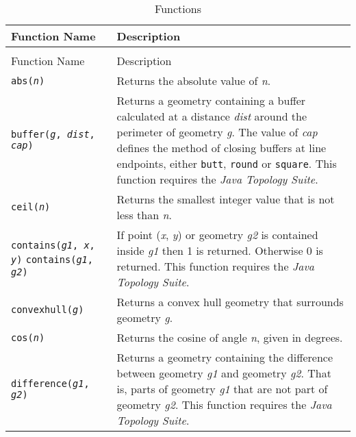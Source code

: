 \begin{longtable}{|p{5cm}|p{7cm}|}
\hline
\label{functions}
Function Name & Description \\
\hline
\hline
\endfirsthead
\hline
\caption{Functions} \\
\endfoot

\hline
Function Name & Description \\
\hline
\hline
\endhead

\texttt{abs(\textit{n})} &
Returns the absolute value of \textit{n}. \\

\hline

\texttt{buffer(\textit{g}, \textit{dist}, \textit{cap})} &
Returns a geometry containing a buffer calculated at
a distance \textit{dist} around the perimeter of geometry \textit{g}.
The value of \textit{cap} defines
the method of closing buffers at line endpoints, either
\texttt{butt}, \texttt{round} or \texttt{square}.
This function requires the \textit{Java Topology Suite}. \\

\hline

\texttt{ceil(\textit{n})} &
Returns the smallest integer value that is not less than \textit{n}. \\

\hline

\texttt{contains(\textit{g1}, \textit{x}, \textit{y})}
\texttt{contains(\textit{g1}, \textit{g2})} &
If point (\textit{x}, \textit{y}) or geometry \textit{g2}
is contained inside \textit{g1} then
1 is returned.  Otherwise 0 is returned.
This function requires the \textit{Java Topology Suite}. \\

\hline

\texttt{convexhull(\textit{g})} &
Returns a convex hull geometry that surrounds geometry \textit{g}. \\

\hline

\texttt{cos(\textit{n})} &
Returns the cosine of angle \textit{n}, given in degrees. \\

\hline

\texttt{difference(\textit{g1}, \textit{g2})} &
Returns a geometry containing the difference between
geometry \textit{g1} and geometry \textit{g2}.  That is, parts
of geometry \textit{g1} that are not part of geometry \textit{g2}.
This function requires the \textit{Java Topology Suite}. \\


\end{longtable}
